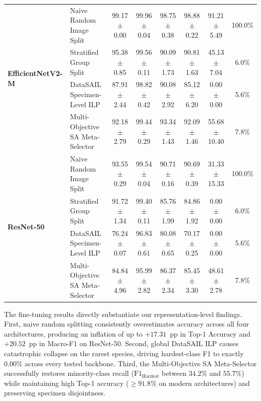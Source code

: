 \documentclass[a4paper,fleqn]{cas-sc}
\begin{document}
\begin{table}[pos=htbp]
{\begin{tabular}{llcccccc}
\midrule
\multirow{4}{*}{\textbf{EfficientNetV2-M}~\cite{efficientnetv2}} & Naive Random Image Split & 99.17 $\pm$ 0.00 & 99.96 $\pm$ 0.04 & 98.75 $\pm$ 0.38 & 98.88 $\pm$ 0.22 & 91.21 $\pm$ 5.49 & 100.0\% \\
 & Stratified Group Split & 95.38 $\pm$ 0.85 & 99.56 $\pm$ 0.11 & 90.09 $\pm$ 1.73 & 90.81 $\pm$ 1.63 & 45.13 $\pm$ 7.04 & 6.0\% \\
 & DataSAIL Specimen-Level ILP & 87.91 $\pm$ 2.44 & 98.82 $\pm$ 0.42 & 90.08 $\pm$ 2.92 & 85.12 $\pm$ 6.20 & 0.00 $\pm$ 0.00 & 5.6\% \\
 & Multi-Objective SA Meta-Selector & 92.18 $\pm$ 2.79 & 99.44 $\pm$ 0.29 & 93.34 $\pm$ 1.43 & 92.09 $\pm$ 1.46 & 55.68 $\pm$ 10.40 & 7.8\% \\
\midrule
\multirow{4}{*}{\textbf{ResNet-50}~\cite{resnet}} & Naive Random Image Split & 93.55 $\pm$ 0.29 & 99.54 $\pm$ 0.04 & 90.71 $\pm$ 0.16 & 90.69 $\pm$ 0.39 & 31.33 $\pm$ 15.33 & 100.0\% \\
 & Stratified Group Split & 91.72 $\pm$ 1.34 & 99.40 $\pm$ 0.11 & 85.76 $\pm$ 1.99 & 84.86 $\pm$ 1.92 & 0.00 $\pm$ 0.00 & 6.0\% \\
 & DataSAIL Specimen-Level ILP & 76.24 $\pm$ 0.07 & 96.83 $\pm$ 0.61 & 80.08 $\pm$ 0.65 & 70.17 $\pm$ 0.25 & 0.00 $\pm$ 0.00 & 5.6\% \\
 & Multi-Objective SA Meta-Selector & 84.84 $\pm$ 4.96 & 95.99 $\pm$ 2.82 & 86.37 $\pm$ 2.34 & 85.45 $\pm$ 3.30 & 48.61 $\pm$ 2.78 & 7.8\% \\
\bottomrule
\end{tabular}%
}
\end{table}

The fine-tuning results directly substantiate our representation-level findings. First, naive random splitting consistently overestimates accuracy across all four architectures, producing an inflation of up to $+17.31$~pp in Top-1 Accuracy and $+20.52$~pp in Macro-F1 on ResNet-50. Second, global DataSAIL ILP causes catastrophic collapse on the rarest species, driving hardest-class F1 to exactly $0.00\%$ across every tested backbone. Third, the Multi-Objective SA Meta-Selector successfully restores minority-class recall ($\mathrm{F1}_{\text{Hardest}}$ between $34.2\%$ and $55.7\%$) while maintaining high Top-1 accuracy ($\ge 91.8\%$ on modern architectures) and preserving specimen disjointness.
\end{document}
